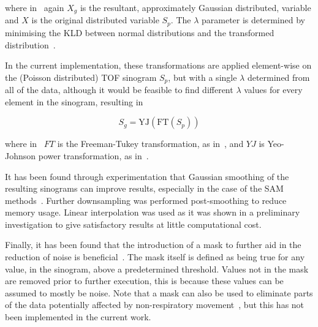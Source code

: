                 \noindent where in~ again $X_g$ is the resultant, approximately Gaussian distributed, variable and $X$ is the original distributed variable $S_p$. The $\lambda$ parameter is determined by minimising the \gls{KLD} between normal distributions and the transformed distribution~\parencite{Yeo2000ASymmetry}. 
                
                In the current implementation, these transformations are applied element-wise on the (Poisson distributed) TOF sinogram $S_p$, but with a single $\lambda$ determined from all of the data, although it would be feasible to find different $\lambda$ values for every element in the sinogram, resulting in
                
                \begin{equation} \label{eq:pca_data_driven_surrogate_signal_extraction_methods_for_dynamic_pet_evaluation_data_preparation_freeman_tukey_yeo_johnson}
                    S_g = \mathrm{YJ}(\mathrm{FT}(S_p))
                \end{equation}
                
                \noindent where in~ $FT$ is the Freeman-Tukey transformation, as in~, and $YJ$ is Yeo-Johnson power transformation, as in~.
                
                It has been found through experimentation that Gaussian smoothing of the resulting sinograms can improve results, especially in the case of the \gls{SAM} methods~\parencite{Thielemans2013ComparisonData}. Further downsampling was performed post-smoothing to reduce memory usage. Linear interpolation was used as it was shown in a preliminary investigation to give  satisfactory results at little computational cost.
                
                Finally, it has been found that the introduction of a mask to further aid in the reduction of noise is beneficial~\parencite{Thielemans2011}. The mask itself is defined as being true for any value, in the sinogram, above a predetermined threshold. Values not in the mask are removed prior to further execution, this is because these values can be assumed to mostly be noise. Note that a mask can also be used to eliminate parts of the data potentially affected by non-respiratory movement~\parencite{Bertolli2018Data-DrivenTomography}, but this has not been implemented in the current work.
        

